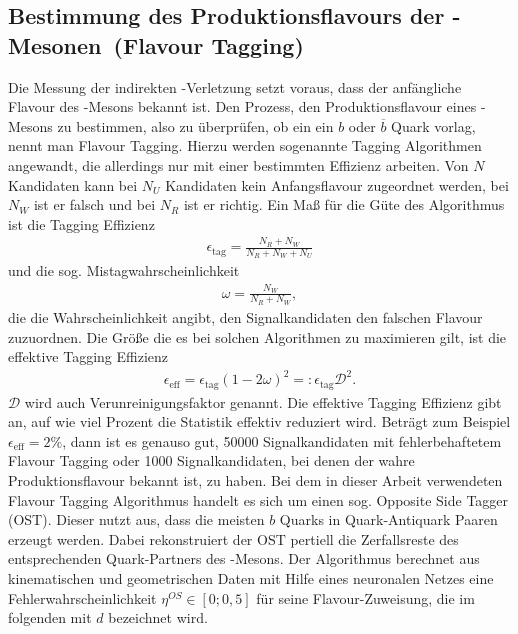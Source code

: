 \subsection[Bestimmung des Produktionsflavours der \Bd-Mesonen (Flavour Tagging)]{Bestimmung des Produktionsflavours der \boldmath\Bd-Mesonen\unboldmath\ (Flavour Tagging)} \label{kap:tagging}
Die Messung der indirekten \CP-Verletzung setzt voraus, dass der anfängliche Flavour des \Bd-Mesons bekannt ist. Den Prozess, den Produktionsflavour eines \Bd-Mesons zu bestimmen, also zu überprüfen, ob ein ein $b$ oder $\overline{b}$ Quark vorlag, nennt man Flavour Tagging. Hierzu werden sogenannte Tagging Algorithmen angewandt, die allerdings nur mit einer bestimmten Effizienz arbeiten. Von $N$ Kandidaten kann bei $N_U$ Kandidaten kein Anfangsflavour zugeordnet werden, bei $N_W$ ist er falsch und bei $N_R$ ist er richtig. Ein Maß für die Güte des Algorithmus ist die Tagging Effizienz
\begin{align}
\epsilon_{\text{tag}} = \frac{N_R+N_W}{N_R+N_W+N_U}
\end{align}
und die sog. Mistagwahrscheinlichkeit
\begin{align}
\omega = \frac{N_W}{N_R+N_W},
\end{align}
die die Wahrscheinlichkeit angibt, den Signalkandidaten den falschen Flavour zuzuordnen. Die Größe die es bei solchen Algorithmen zu maximieren gilt, ist die effektive Tagging Effizienz
\begin{align}
\epsilon_{\text{eff}} = \epsilon_{\text{tag}}(1-2\omega)^2 =: \epsilon_{\text{tag}} \mathcal{D}^2.
\end{align}
$\mathcal{D}$ wird auch Verunreinigungsfaktor genannt. Die effektive Tagging Effizienz gibt an, auf wie viel Prozent die Statistik effektiv reduziert wird. Beträgt zum Beispiel $\epsilon_{\text{eff}} = 2\%$, dann ist es genauso gut, 50000 Signalkandidaten mit fehlerbehaftetem Flavour Tagging oder 1000 Signalkandidaten, bei denen der wahre Produktionsflavour bekannt ist, zu haben. Bei dem in dieser Arbeit verwendeten Flavour Tagging Algorithmus handelt es sich um einen sog. Opposite Side Tagger (OST). Dieser nutzt aus, dass die meisten $b$ Quarks in Quark-Antiquark Paaren erzeugt werden. Dabei rekonstruiert der OST pertiell die Zerfallsreste des entsprechenden Quark-Partners des \Bd-Mesons. Der Algorithmus berechnet aus kinematischen und geometrischen Daten mit Hilfe eines neuronalen Netzes eine Fehlerwahrscheinlichkeit $\eta^{OS} \in [0;0,5]$ für seine Flavour-Zuweisung, die im folgenden mit $d$ bezeichnet wird. \cite{lhcb-paper}

